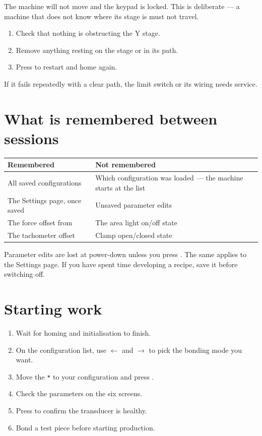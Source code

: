 The machine will not move and the keypad is locked. This is deliberate --- a
machine that does not know where its stage is must not travel.

\begin{enumerate}[leftmargin=*]
\item Check that nothing is obstructing the Y stage.
\item Remove anything resting on the stage or in its path.
\item Press  to restart and home again.
\end{enumerate}

If it fails repeatedly with a clear path, the limit switch or its wiring needs
service.

\section{What is remembered between sessions}

\begin{center}\small
\begin{tabular}{@{}L{50mm}L{72mm}@{}}
\toprule
\textbf{Remembered} & \textbf{Not remembered} \\
\midrule
All saved configurations & Which configuration was loaded --- the machine
                           starts at the list \\
The Settings page, once saved & Unsaved parameter edits \\
The force offset from  & The area light on/off state \\
The tachometer offset & Clamp open/closed state \\
\bottomrule
\end{tabular}
\end{center}

\begin{wbwarning}
Parameter edits are lost at power-down unless you press . The same
applies to the Settings page. If you have spent time developing a recipe, save
it before switching off.
\end{wbwarning}

\section{Starting work}

\begin{enumerate}[leftmargin=*]
\item Wait for homing and initialisation to finish.
\item On the configuration list, use $\leftarrow$ and $\rightarrow$ to pick the
  bonding mode you want.
\item Move the \texttt{*} to your configuration and press .
\item Check the parameters on the six screens.
\item Press  to confirm the transducer is healthy.
\item Bond a test piece before starting production.
\end{enumerate}
